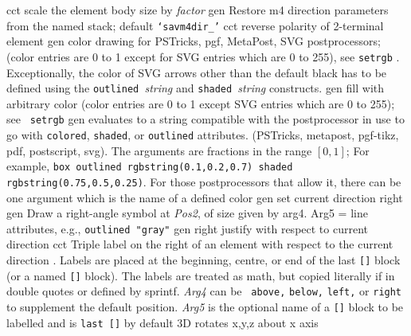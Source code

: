   {cct}
  {scale the element body size by {\sl factor}}
  {gen}
  {Restore m4 direction parameters from the named stack;
    default {\tt `savm4dir\_'}}
  {cct}
  {reverse polarity of 2-terminal element}
  {gen}
  {color drawing for PSTricks, pgf, MetaPost, SVG postprocessors;
   (color entries are 0 to 1 except for SVG entries which are 0 to 255),
   see {\tt setrgb} .  Exceptionally, the color
   of SVG arrows other than the default black has to be defined using the
   {\tt outlined }{\sl string} and {\tt shaded }{\sl string} constructs.}
  {gen}
  {fill with arbitrary color (color entries are 0 to 1 except
   SVG entries which are 0 to 255); see {\tt
   setrgb}}
  {gen}
  {evaluates to a string compatible with the postprocessor in use
   to go with {\tt colored}, {\tt shaded}, or {\tt outlined} attributes.
   (PSTricks, metapost, pgf-tikz, pdf, postscript, svg).  The arguments
   are fractions in the range $[0,1]$; For example, {\tt box outlined
   rgbstring(0.1,0.2,0.7) shaded rgbstring(0.75,0.5,0.25)}.  For those
   postprocessors that allow it, there can be one argument which is the
   name of a defined color}
  {gen}
  {set current direction right }
 {gen}
  {Draw a right-angle symbol at {\sl Pos2}, of size
  given by arg4. Arg5 =
   line attributes, e.g., {\tt outlined "gray"}}
  {gen}
  {right justify with respect to current direction}
  {cct}
  {Triple label on the right of an element with respect to the current
    direction .  Labels are placed at the beginning,
    centre, or end of the last {\tt []} block (or a named {\tt []}
    block). The labels are treated as math, but copied literally if
    in double quotes or defined by sprintf.  {\sl Arg4} can be {\tt
    above,} {\tt below,} {\tt left,} or {\tt right} to supplement the
    default position.  {\sl Arg5} is the optional name of a {\tt []}
    block to be labelled and is {\tt last []} by default}
  {3D} {rotates x,y,z about x axis}
